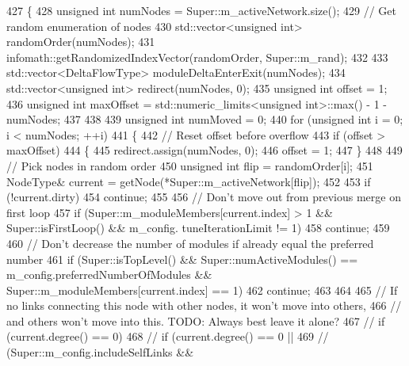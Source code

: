 \begin{DoxyCode}
427 \{
428     \textcolor{keywordtype}{unsigned} \textcolor{keywordtype}{int} numNodes = Super::m\_activeNetwork.size();
429     \textcolor{comment}{// Get random enumeration of nodes}
430     std::vector<unsigned int> randomOrder(numNodes);
431     infomath::getRandomizedIndexVector(randomOrder, Super::m\_rand);
432 
433     std::vector<DeltaFlowType> moduleDeltaEnterExit(numNodes);
434     std::vector<unsigned int> redirect(numNodes, 0);
435     \textcolor{keywordtype}{unsigned} \textcolor{keywordtype}{int} offset = 1;
436     \textcolor{keywordtype}{unsigned} \textcolor{keywordtype}{int} maxOffset = std::numeric\_limits<unsigned int>::max() - 1 - numNodes;
437 
438 
439     \textcolor{keywordtype}{unsigned} \textcolor{keywordtype}{int} numMoved = 0;
440     \textcolor{keywordflow}{for} (\textcolor{keywordtype}{unsigned} \textcolor{keywordtype}{int} i = 0; i < numNodes; ++i)
441     \{
442         \textcolor{comment}{// Reset offset before overflow}
443         \textcolor{keywordflow}{if} (offset > maxOffset)
444         \{
445             redirect.assign(numNodes, 0);
446             offset = 1;
447         \}
448 
449         \textcolor{comment}{// Pick nodes in random order}
450         \textcolor{keywordtype}{unsigned} \textcolor{keywordtype}{int} flip = randomOrder[i];
451         NodeType& current = getNode(*Super::m\_activeNetwork[flip]);
452 
453         \textcolor{keywordflow}{if} (!current.dirty)
454             \textcolor{keywordflow}{continue};
455 
456         \textcolor{comment}{// Don't move out from previous merge on first loop}
457         \textcolor{keywordflow}{if} (Super::m\_moduleMembers[current.index] > 1 && Super::isFirstLoop() && m\_config.
      tuneIterationLimit != 1)
458             \textcolor{keywordflow}{continue};
459 
460         \textcolor{comment}{// Don't decrease the number of modules if already equal the preferred number}
461         \textcolor{keywordflow}{if} (Super::isTopLevel() && Super::numActiveModules() == m\_config.preferredNumberOfModules && 
      Super::m\_moduleMembers[current.index] == 1)
462             \textcolor{keywordflow}{continue};
463 
464 
465         \textcolor{comment}{// If no links connecting this node with other nodes, it won't move into others,}
466         \textcolor{comment}{// and others won't move into this. TODO: Always best leave it alone?}
467 \textcolor{comment}{//      if (current.degree() == 0)}
468         \textcolor{comment}{// if (current.degree() == 0 ||}
469         \textcolor{comment}{//  (Super::m\_config.includeSelfLinks &&}

\end{DoxyCode}
